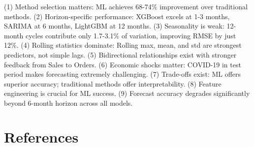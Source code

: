 \documentclass[12pt]{article}
\begin{document}
(1) Method selection matters: ML achieves 68-74\% improvement over traditional methods. (2) Horizon-specific performance: XGBoost excels at 1-3 months, SARIMA at 6 months, LightGBM at 12 months. (3) Seasonality is weak: 12-month cycles contribute only 1.7-3.1\% of variation, improving RMSE by just 12\%. (4) Rolling statistics dominate: Rolling max, mean, and std are strongest predictors, not simple lags. (5) Bidirectional relationships exist with stronger feedback from Sales to Orders. (6) Economic shocks matter: COVID-19 in test period makes forecasting extremely challenging. (7) Trade-offs exist: ML offers superior accuracy; traditional methods offer interpretability. (8) Feature engineering is crucial for ML success. (9) Forecast accuracy degrades significantly beyond 6-month horizon across all models.

\section*{\textbf{References}}
\end{document}
